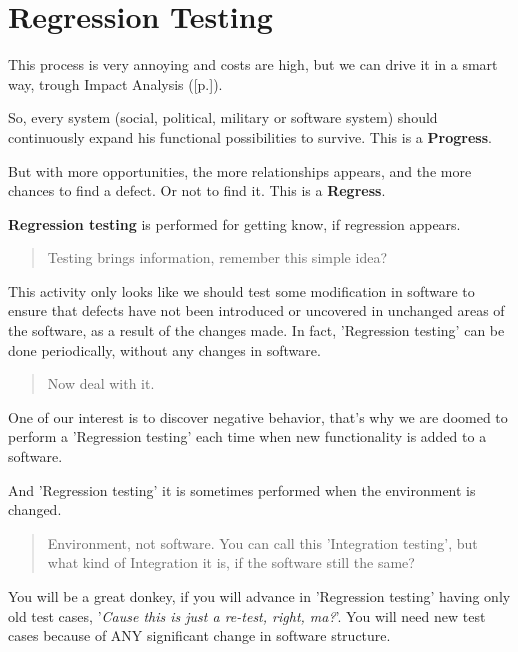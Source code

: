 \section{Regression Testing}
\label{sec:Regression Testing}

This process is very annoying and costs are high, but we can drive it in a smart way, trough Impact Analysis ([p.\pageref{sec:Impact Analysis}]).

So, every system (social, political, military or software system) should continuously expand his functional possibilities to survive. This is a \textbf{Progress}.

But with more opportunities, the more relationships appears, and the more chances to find a defect. Or not to find it. This is a \textbf{Regress}.

\textbf{Regression testing} is performed for getting know, if regression appears.

\begin{quote}
 Testing brings information, remember this simple idea?
 \end{quote} 

This activity only looks like we should test some modification in software to ensure that defects have not been introduced or uncovered in unchanged areas of the software, as a result of the changes made. In fact, 'Regression testing' can be done periodically, without any changes in software. 

\begin{quote}
Now deal with it.\end{quote} 

One of our interest is to discover negative behavior, that's why we are doomed to perform a 'Regression testing' each time when new functionality is added to a software.

And 'Regression testing' it is sometimes performed when the environment is changed.

\begin{quote}
 Environment, not software. You can call this 'Integration testing', but what kind of Integration it is, if the software still the same?
\end{quote} 

You will be a great donkey, if you will advance in 'Regression testing' having only old test cases, '\textit{Cause this is just a re-test, right, ma?}'. You will need new test cases because of ANY significant change in software structure.